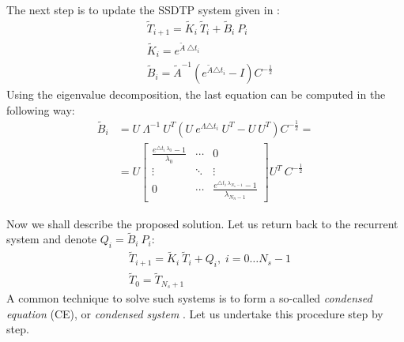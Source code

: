 The next step is to update the SSDTP system given in :
\begin{align}
  & \tilde{T}_{i+1} = \tilde{K}_i \: \tilde{T}_i + \tilde{B}_i \: P_i \label{eq:recurrent-equation} \\
  & \tilde{K}_i = e^{\tilde{A} \: \triangle t_i} \nonumber \\
  & \tilde{B}_i = \tilde{A}^{-1} \left( e^{\tilde{A} \triangle t_i} - I \right) C^{-\frac{1}{2}} \nonumber
\end{align}
Using the eigenvalue decomposition, the last equation can be computed in the following way:
\begin{align*}
  \tilde{B}_i & = U \: \Lambda^{-1} \: U^T \left(U \: e^{\Lambda \triangle t_i} \: U^T - U \: U^T \right) C^{-\frac{1}{2}} = \\
      & = U \left[
        \begin{array}{ccc}
          \frac{e^{\triangle t_i \: \lambda_0} - 1}{\lambda_0} & \cdots & 0 \\
          \vdots & \ddots & \vdots \\
          0 & \cdots & \frac{e^{\triangle t_i \: \lambda_{N_n - 1}} - 1}{\lambda_{N_n - 1}}
        \end{array}
      \right] U^T \: C^{-\frac{1}{2}}
\end{align*}

Now we shall describe the proposed solution. Let us return back to the recurrent system and denote $Q_i = \tilde{B}_i \: P_i$:
\begin{align}
  & \tilde{T}_{i + 1} = \tilde{K}_i \: \tilde{T}_i + Q_i, \; i = 0 \dots N_s - 1 \label{eq:ce-recurrent} \\
  & \tilde{T}_0 = \tilde{T}_{N_s + 1} \nonumber
\end{align}
A common technique to solve such systems is to form a so-called \emph{condensed equation} (CE), or \emph{condensed system} \cite{stoer2002}. Let us undertake this procedure step by step.

